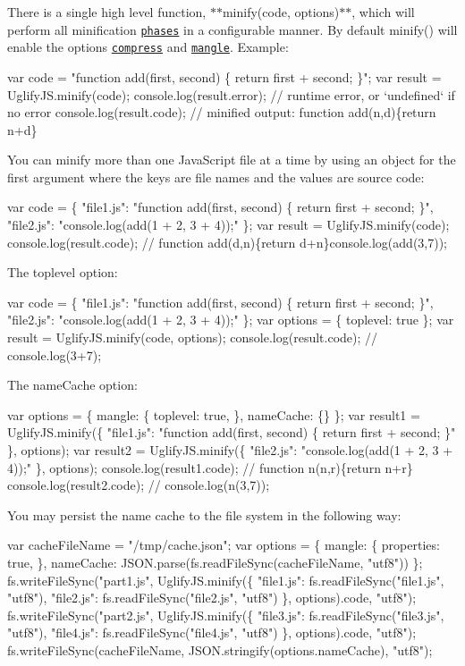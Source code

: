 There is a single high level function, $\ast$$\ast${\ttfamily minify(code, options)}$\ast$$\ast$, which will perform all minification \href{#minify-options}{\tt phases} in a configurable manner. By default {\ttfamily minify()} will enable the options \href{#compress-options}{\tt {\ttfamily compress}} and \href{#mangle-options}{\tt {\ttfamily mangle}}. Example\+: 
\begin{DoxyCode}
var code = "function add(first, second) \{ return first + second; \}";
var result = UglifyJS.minify(code);
console.log(result.error); // runtime error, or `undefined` if no error
console.log(result.code);  // minified output: function add(n,d)\{return n+d\}
\end{DoxyCode}


You can {\ttfamily minify} more than one Java\+Script file at a time by using an object for the first argument where the keys are file names and the values are source code\+: 
\begin{DoxyCode}
var code = \{
    "file1.js": "function add(first, second) \{ return first + second; \}",
    "file2.js": "console.log(add(1 + 2, 3 + 4));"
\};
var result = UglifyJS.minify(code);
console.log(result.code);
// function add(d,n)\{return d+n\}console.log(add(3,7));
\end{DoxyCode}


The {\ttfamily toplevel} option\+: 
\begin{DoxyCode}
var code = \{
    "file1.js": "function add(first, second) \{ return first + second; \}",
    "file2.js": "console.log(add(1 + 2, 3 + 4));"
\};
var options = \{ toplevel: true \};
var result = UglifyJS.minify(code, options);
console.log(result.code);
// console.log(3+7);
\end{DoxyCode}


The {\ttfamily name\+Cache} option\+: 
\begin{DoxyCode}
var options = \{
    mangle: \{
        toplevel: true,
    \},
    nameCache: \{\}
\};
var result1 = UglifyJS.minify(\{
    "file1.js": "function add(first, second) \{ return first + second; \}"
\}, options);
var result2 = UglifyJS.minify(\{
    "file2.js": "console.log(add(1 + 2, 3 + 4));"
\}, options);
console.log(result1.code);
// function n(n,r)\{return n+r\}
console.log(result2.code);
// console.log(n(3,7));
\end{DoxyCode}


You may persist the name cache to the file system in the following way\+: 
\begin{DoxyCode}
var cacheFileName = "/tmp/cache.json";
var options = \{
    mangle: \{
        properties: true,
    \},
    nameCache: JSON.parse(fs.readFileSync(cacheFileName, "utf8"))
\};
fs.writeFileSync("part1.js", UglifyJS.minify(\{
    "file1.js": fs.readFileSync("file1.js", "utf8"),
    "file2.js": fs.readFileSync("file2.js", "utf8")
\}, options).code, "utf8");
fs.writeFileSync("part2.js", UglifyJS.minify(\{
    "file3.js": fs.readFileSync("file3.js", "utf8"),
    "file4.js": fs.readFileSync("file4.js", "utf8")
\}, options).code, "utf8");
fs.writeFileSync(cacheFileName, JSON.stringify(options.nameCache), "utf8");
\end{DoxyCode}


